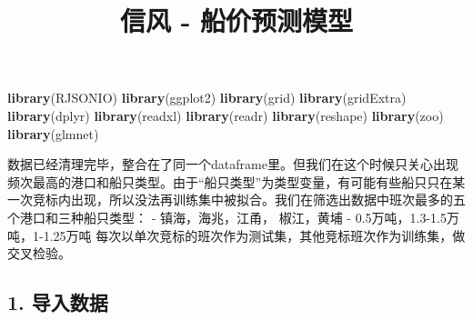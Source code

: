\documentclass[]{article}
\title{信风 - 船价预测模型}
\author{}
\date{}
\newenvironment{Shaded}{\begin{snugshade}}{\end{snugshade}}
\newcommand{\KeywordTok}[1]{\textcolor[rgb]{0.13,0.29,0.53}{\textbf{#1}}}
\newcommand{\StringTok}[1]{\textcolor[rgb]{0.31,0.60,0.02}{#1}}
\newcommand{\OperatorTok}[1]{\textcolor[rgb]{0.81,0.36,0.00}{\textbf{#1}}}
\newcommand{\NormalTok}[1]{#1}
\begin{document}
\maketitle

\begin{Shaded}
\begin{Highlighting}[]
\KeywordTok{library}\NormalTok{(RJSONIO)}
\KeywordTok{library}\NormalTok{(ggplot2)}
\KeywordTok{library}\NormalTok{(grid)}
\KeywordTok{library}\NormalTok{(gridExtra)}
\KeywordTok{library}\NormalTok{(dplyr)}
\KeywordTok{library}\NormalTok{(readxl)}
\KeywordTok{library}\NormalTok{(readr)}
\KeywordTok{library}\NormalTok{(reshape)}
\KeywordTok{library}\NormalTok{(zoo)}
\KeywordTok{library}\NormalTok{(glmnet)}
\end{Highlighting}
\end{Shaded}

数据已经清理完毕，整合在了同一个dataframe里。但我们在这个时候只关心出现频次最高的港口和船只类型。由于``船只类型''为类型变量，有可能有些船只只在某一次竞标内出现，所以没法再训练集中被拟合。我们在筛选出数据中班次最多的五个港口和三种船只类型：
- 镇海，海兆，江甬， 椒江，黄埔 - 0.5万吨，1.3-1.5万吨，1-1.25万吨
每次以单次竞标的班次作为测试集，其他竞标班次作为训练集，做交叉检验。

\subsection{1. 导入数据}

\begin{Shaded}
\end{Shaded}
\end{document}
